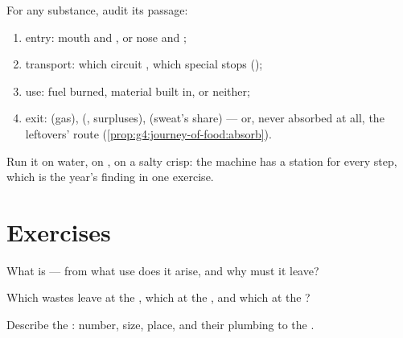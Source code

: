 \begin{method}\label{met:g7:removing-wastes:audit}
For any substance, audit its passage:
\begin{enumerate}
  \item entry: mouth and , or nose and ;
  \item transport: which circuit , which special
        stops ();
  \item use: fuel burned, material built in, or neither;
  \item exit:  (gas),  (, surpluses),
         (sweat's share) --- or, never absorbed at
        all, the leftovers' route
        (\cref{prop:g4:journey-of-food:absorb}).
\end{enumerate}
Run it on water, on , on a salty crisp: the
machine has a station for every step, which is the
year's finding in one exercise.
\end{method}

\section{Exercises}

\begin{exercise}[$\star$]\label{exo:g7:removing-wastes:1}
What is  --- from what use does it arise, and why
must it leave?
\end{exercise}

\begin{exercise}[$\star$]\label{exo:g7:removing-wastes:2}
Which wastes leave at the , which at the ,
and which at the ?
\end{exercise}

\begin{exercise}[$\star$]\label{exo:g7:removing-wastes:3}
Describe the : number, size, place, and their
plumbing to the .
\end{exercise}

